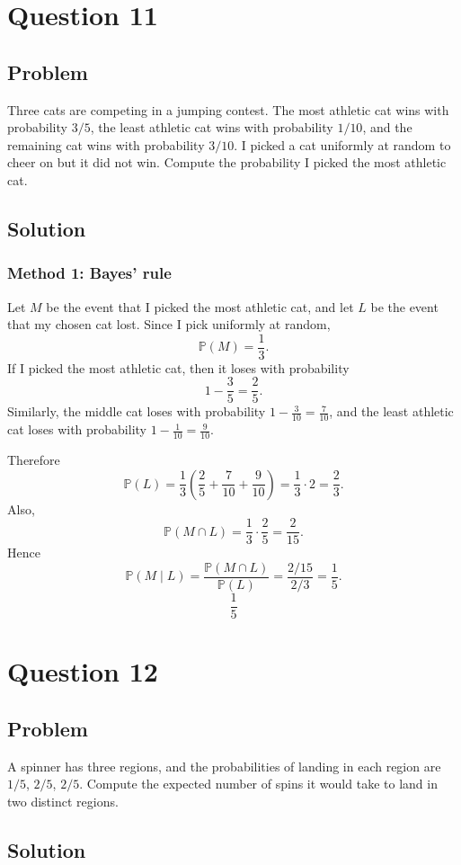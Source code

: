 \documentclass[12pt]{article}
\begin{document}
\newpage
\section{Question 11}
\subsection{Problem}
Three cats are competing in a jumping contest. The most athletic cat wins with probability $3/5$, the least athletic cat wins with probability $1/10$, and the remaining cat wins with probability $3/10$. I picked a cat uniformly at random to cheer on but it did not win. Compute the probability I picked the most athletic cat.

\subsection{Solution}
\subsubsection{Method 1: Bayes' rule}
Let $M$ be the event that I picked the most athletic cat, and let $L$ be the event that my chosen cat lost.
Since I pick uniformly at random,
\[
\mathbb{P}(M)=\frac13.
\]
If I picked the most athletic cat, then it loses with probability
\[
1-\frac35 = \frac25.
\]
Similarly, the middle cat loses with probability $1-\frac{3}{10}=\frac{7}{10}$, and the least athletic cat loses with probability $1-\frac{1}{10}=\frac{9}{10}$.

Therefore
\[
\mathbb{P}(L)
=
\frac13\left(\frac25+\frac{7}{10}+\frac{9}{10}\right)
=
\frac13\cdot 2
=
\frac23.
\]
Also,
\[
\mathbb{P}(M\cap L)=\frac13\cdot \frac25 = \frac{2}{15}.
\]
Hence
\[
\mathbb{P}(M\mid L)=\frac{\mathbb{P}(M\cap L)}{\mathbb{P}(L)}
=\frac{2/15}{2/3}=\frac15.
\]
\[
\boxed{\frac15}
\]

\newpage
\section{Question 12}
\subsection{Problem}
A spinner has three regions, and the probabilities of landing in each region are $1/5$, $2/5$, $2/5$. Compute the expected number of spins it would take to land in two distinct regions.

\subsection{Solution}
\end{document}
